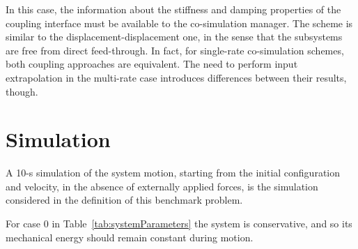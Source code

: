 \documentclass[fleqn,11pt]{article}
\begin{document}
In this case, the information about the stiffness and damping properties of the coupling interface must be available to the co-simulation manager.
The scheme is similar to the displacement-displacement one, in the sense that the subsystems are free from direct feed-through. 
In fact, for single-rate co-simulation schemes, both coupling approaches are equivalent.
The need to perform input extrapolation in the multi-rate case introduces differences between their results, though.


\section{Simulation}
\label{Simulation}

A 10-s simulation of the system motion, starting from the initial configuration and velocity, in the absence of externally applied forces, is the simulation considered in the definition of this benchmark problem.

For case 0 in Table~\ref{tab:systemParameters} the system is conservative, and so its mechanical energy should remain constant during motion.

\pagebreak
\pagestyle{bib}

\end{document}
